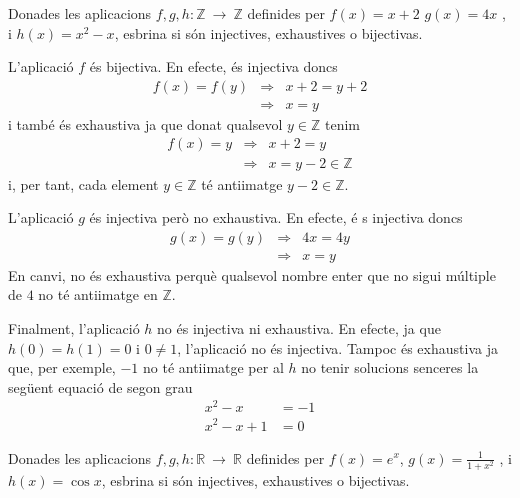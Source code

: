 \begin{exercici}
Donades les aplicacions $f,g,h:\mathbb{Z}~\longrightarrow ~\mathbb{Z}$
definides per $f(x)=x+2$ $g(x)=4x$ , i $h(x)=x^{2}-x$, esbrina si s\'{o}n
injectives, exhaustives o bijectivas.
\end{exercici}

\begin{solucio}
L'aplicaci\'{o} $f$ \'{e}s bijectiva. En efecte, \'{e}s injectiva doncs%
\begin{equation*}
\begin{array}{lll}
f(x)=f(y) & \Longrightarrow & x+2=y+2 \\
& \Longrightarrow & x=y%
\end{array}%
\end{equation*}%
i tamb\'{e} \'{e}s exhaustiva ja que donat qualsevol $y\in \mathbb{Z}$ tenim%
\begin{equation*}
\begin{array}{lll}
f(x)=y & \Longrightarrow & x+2=y \\
& \Longrightarrow & x=y-2\in \mathbb{Z}%
\end{array}%
\end{equation*}%
i, per tant, cada element $y\in \mathbb{Z}$ t\'{e} antiimatge $y-2\in
\mathbb{Z}$.

L'aplicaci\'{o} $g$ \'{e}s injectiva per\`{o} no exhaustiva. En efecte, \'{e}%
s injectiva doncs%
\begin{equation*}
\begin{array}{lll}
g(x)=g(y) & \Longrightarrow & 4x=4y \\
& \Longrightarrow & x=y%
\end{array}%
\end{equation*}%
En canvi, no \'{e}s exhaustiva perqu\`{e} qualsevol nombre enter que no
sigui m\'{u}ltiple de $4$ no t\'{e} antiimatge en $\mathbb{Z}$.

Finalment, l'aplicaci\'{o} $h$ no \'{e}s injectiva ni exhaustiva. En efecte,
ja que $h(0)=h(1)=0$ i $0\neq 1$, l'aplicaci\'{o} no \'{e}s injectiva.
Tampoc \'{e}s exhaustiva ja que, per exemple, $-1$ no t\'{e} antiimatge per
al $h$ no tenir solucions senceres la seg\"{u}ent equaci\'{o} de segon grau%
\begin{align*}
x^{2}-x& =-1 \\
x^{2}-x+1& =0
\end{align*}
\end{solucio}

\begin{exercici}
Donades les aplicacions $f,g,h:\mathbb{R}~\longrightarrow ~\mathbb{R}$
definides per $f(x)=e^{x}$, $g(x)=\frac{1}{1+x^{2}}$ , i $h(x)=\cos x$,
esbrina si s\'{o}n injectives, exhaustives o bijectivas.
\end{exercici}

